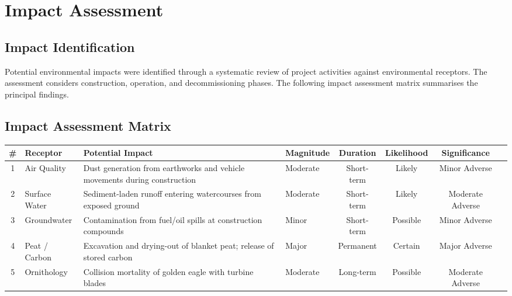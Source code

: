 \section{Impact Assessment}

\subsection{Impact Identification}
Potential environmental impacts were identified through a systematic review of project activities against environmental receptors. The assessment considers construction, operation, and decommissioning phases. The following impact assessment matrix summarises the principal findings.

\begin{landscape}
\subsection{Impact Assessment Matrix}
\vspace{8pt}
\renewcommand{\arraystretch}{1.4}
\footnotesize
\begin{tabularx}{\linewidth}{@{}c >{\raggedright\arraybackslash}p{2.4cm} >{\raggedright\arraybackslash}X >{\raggedright\arraybackslash}p{1.4cm} c c c >{\raggedright\arraybackslash}p{1.4cm} @{}}
\toprule
\rowcolor{accent}
\color{white}\bfseries \# & \color{white}\bfseries Receptor & \color{white}\bfseries Potential Impact & \color{white}\bfseries Magnitude & \color{white}\bfseries Duration & \color{white}\bfseries Likelihood & \color{white}\bfseries Significance \\
\midrule
\rowcolor{rowshade}
1 & Air Quality & Dust generation from earthworks and vehicle movements during construction & Moderate & Short-term & Likely & Minor Adverse \\
2 & Surface Water & Sediment-laden runoff entering watercourses from exposed ground & Moderate & Short-term & Likely & Moderate Adverse \\
\rowcolor{rowshade}
3 & Groundwater & Contamination from fuel/oil spills at construction compounds & Minor & Short-term & Possible & Minor Adverse \\
4 & Peat / Carbon & Excavation and drying-out of blanket peat; release of stored carbon & Major & Permanent & Certain & Major Adverse \\
\rowcolor{rowshade}
5 & Ornithology & Collision mortality of golden eagle with turbine blades & Moderate & Long-term & Possible & Moderate Adverse \\

\end{tabularx}
\end{landscape}
